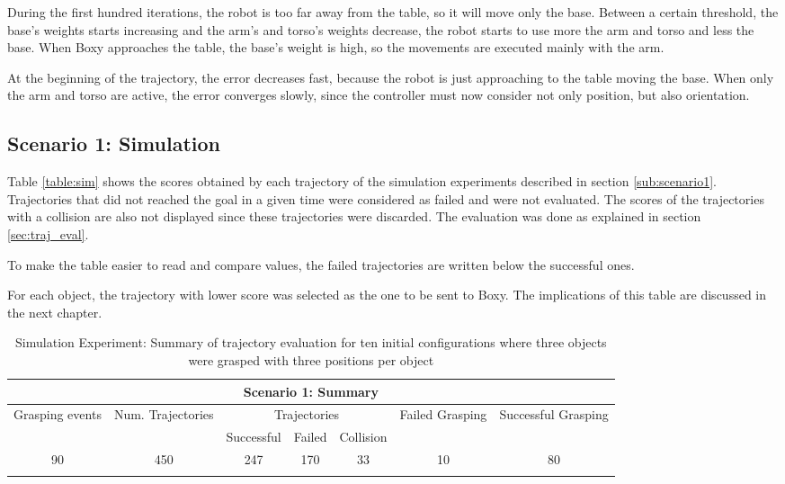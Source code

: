 During the first hundred iterations, the robot is too far away from the table, so it will move only the base. Between a certain threshold, the base's weights starts increasing and the arm's and torso's weights decrease, the robot starts to use more the arm and torso and less the base. When Boxy approaches the table, the base's weight is high, so the movements are executed mainly with the arm.

At the beginning of the trajectory, the error decreases fast, because the robot is just approaching to the table moving the base. When only the arm and torso are active, the error converges slowly, since the controller must now consider not only position, but also orientation.

\subsection{Scenario 1: Simulation}
\label{res:sim}

Table \ref{table:sim} shows the scores obtained by each trajectory of the simulation experiments described in section \ref{sub:scenario1}.   Trajectories that did not reached the goal in a given time were considered as failed and were not evaluated. The scores of the trajectories with a collision are also not displayed since these trajectories were discarded. The evaluation was done as explained in section \ref{sec:traj_eval}.

To make the table easier to read and compare values, the failed trajectories are written below the successful ones.

 \vspace{-60pt}

For each object, the trajectory with lower score was selected as the one to be sent to Boxy. The implications of this table are discussed in the next chapter.

{\small
\begin{center}
\begin{longtable}[c]{ | c | c | c | c | c | c || c || }
\hline
\hline
\multicolumn{7}{|c|}{Scenario 1: Summary} \\
\hline
\hline
\multirow{2}{1.7cm}{Grasping events} & \multirow{2}{1.7cm}{Num. Trajectories} & \multicolumn{3}{c|}{Trajectories} & \multirow{2}{1.5cm}{Failed Grasping} & \multirow{2}{1.5cm}{Successful Grasping} \\
& & Successful & Failed & Collision & &\\
\hline
90 & 450 & 247 & 170 & 33 & 10 & 80 \\ 
\hline
\caption{Simulation Experiment: Summary of trajectory evaluation for ten initial configurations where three objects were grasped with three positions per object}
\label{table:summary}
\end{longtable}
\end{center}} \vspace{-50pt}

